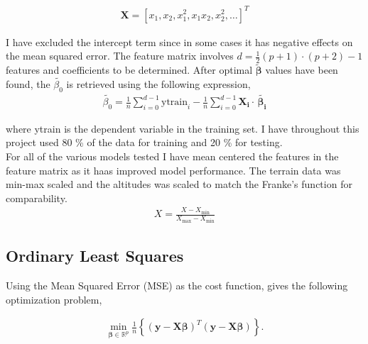 \documentclass[a4paper,12pt]{article}
\begin{document}
\begin{equation} \label{}
\begin{split}
\boldsymbol{X}=[x_1,x_2,x_1^2,x_1x_2,x_2^2, \dots]^T
\end{split}
\end{equation}

\noindent
I have excluded the intercept term since in some cases it has negative effects on the mean squared error. The feature matrix  involves $d=\frac{1}{2}(p+1)\cdot(p+2)-1$ features and  coefficients to be determined. After optimal $\boldsymbol{\tilde{\beta}}$ values have been found, the $\tilde{\beta_0}$  is retrieved using the following expression,
\begin{equation} \label{}
\begin{split}
\tilde{\beta_0}=\frac{1}{n} \sum_{i=0}^{d-1}\text{ytrain}_i - \frac{1}{n}\sum_{i=0}^{d-1}\mathbf{X_i}\cdot \, \boldsymbol{\tilde{\beta_i}} 
\end{split}
\end{equation}

\noindent 
where ytrain is the dependent variable in the training set. I have throughout this project used 80 \% of the data for training and 20 \% for testing. \\

\noindent 
For all of the various models tested I have mean centered the features in the feature matrix as it haas improved model performance. The terrain data was min-max scaled and the altitudes was scaled to match the Franke's function for comparability.
\begin{equation} \label{}
\begin{split}
X=\frac{X-X_{\text{min}}}{X_{\text{max}}-X_{\text{min}}} 
\end{split}
\end{equation}





\subsection{Ordinary Least Squares}
Using the Mean Squared Error (MSE) as the cost function, gives the following optimization problem,

\begin{equation} \label{eq1}
\begin{split}
{\displaystyle \min_{\boldsymbol{\beta}\in {\mathbb{R}}^{p}}}\frac{1}{n}\left\{\left(\boldsymbol{y}-\boldsymbol{X}\boldsymbol{\beta}\right)^T\left(\boldsymbol{y}-\boldsymbol{X}\boldsymbol{\beta}\right)\right\}.
\end{split}
\end{equation}
\end{document}
